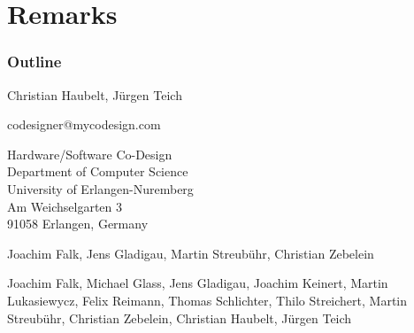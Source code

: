 \section{Remarks}
\begin{frame}
  \frametitle{Outline}
\end{frame}


\begin{frame}
\begin{description}[\breaklabel\setleftmargin{60pt}\setlabelstyle{\color{beamer@SystemCoDesigner@color}}]
\item[Contact Persons:]
Christian Haubelt, Jürgen Teich
\item[Email:] codesigner@mycodesign.com
\item[Address:]
Hardware/Software Co-Design\\
Department of Computer Science\\
University of Erlangen-Nuremberg\\
Am Weichselgarten 3\\
91058 Erlangen, Germany
\end{description}
\end{frame}




\begin{frame}
\begin{description}[\breaklabel\setleftmargin{60pt}\setlabelstyle{\color{beamer@SystemCoDesigner@color}}]
\item[SysteMoC Development Team:]
Joachim Falk, Jens Gladigau, Martin Streubühr, Christian Zebelein
\item[SystemCoDesigner Contributors:]
Joachim Falk, Michael Glass, Jens Gladigau, Joachim Keinert, Martin Lukasiewycz, Felix Reimann, Thomas Schlichter, Thilo Streichert, Martin Streubühr, Christian Zebelein, Christian Haubelt, Jürgen Teich
\end{description}
\end{frame}



